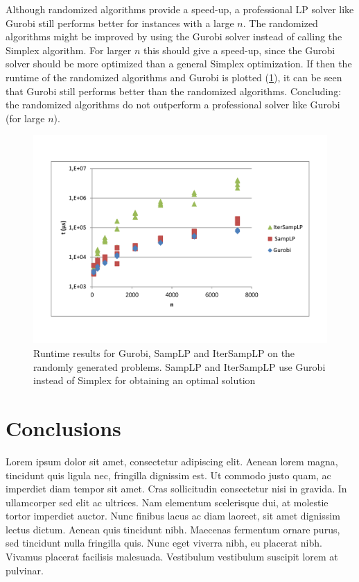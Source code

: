 \documentclass[nocopyrightspace]{acm_proc_article-sp}
\begin{document}
Although randomized algorithms provide a speed-up, a professional LP solver like Gurobi still performs better for instances with a large $n$. The randomized algorithms might be improved by using the Gurobi solver instead of calling the Simplex algorithm. For larger $n$ this should give a speed-up, since the Gurobi solver should be more optimized than a general Simplex optimization. If then the runtime of the randomized algorithms and Gurobi is plotted (\ref{fig:gurobiruntime}), it can be seen that Gurobi still performs better than the randomized algorithms. Concluding: the randomized algorithms do not outperform a professional solver like Gurobi (for large $n$). 

\begin{figure}[h!]
\includegraphics[width=\columnwidth]{../Results/gurobi_runtime.pdf}
\caption{Runtime results for Gurobi, SampLP and IterSampLP on the randomly generated problems. SampLP and IterSampLP use Gurobi instead of Simplex for obtaining an optimal solution}
\label{fig:gurobiruntime}
\end{figure}

\section{Conclusions}
Lorem ipsum dolor sit amet, consectetur adipiscing elit. Aenean lorem magna, tincidunt quis ligula nec, fringilla dignissim est. Ut commodo justo quam, ac imperdiet diam tempor sit amet. Cras sollicitudin consectetur nisi in gravida. In ullamcorper sed elit ac ultrices. Nam elementum scelerisque dui, at molestie tortor imperdiet auctor. Nunc finibus lacus ac diam laoreet, sit amet dignissim lectus dictum. Aenean quis tincidunt nibh. Maecenas fermentum ornare purus, sed tincidunt nulla fringilla quis. Nunc eget viverra nibh, eu placerat nibh. Vivamus placerat facilisis malesuada. Vestibulum vestibulum suscipit lorem at pulvinar.
\end{document}
